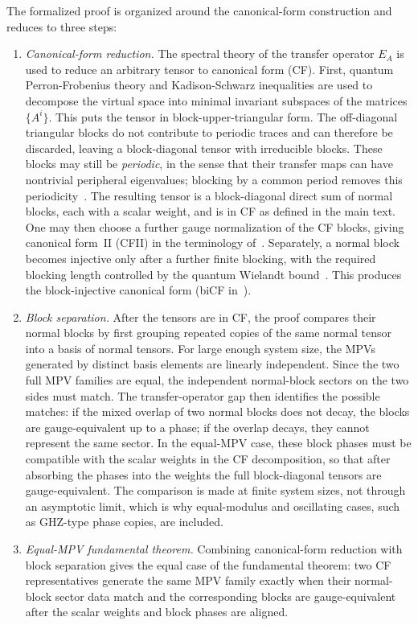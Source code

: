 The formalized proof is organized around the canonical-form construction and reduces to three steps:
\begin{enumerate}[label={(\roman*)},leftmargin=*]
    \item \textit{Canonical-form reduction.} The spectral theory of the transfer operator $E_A$ is used to reduce an arbitrary tensor to canonical form (CF). First, quantum Perron-Frobenius theory and Kadison-Schwarz inequalities are used to decompose the virtual space into minimal invariant subspaces of the matrices $\{A^i\}$. This puts the tensor in block-upper-triangular form. The off-diagonal triangular blocks do not contribute to periodic traces and can therefore be discarded, leaving a block-diagonal tensor with irreducible blocks. These blocks may still be \textit{periodic}, in the sense that their transfer maps can have nontrivial peripheral eigenvalues; blocking by a common period removes this periodicity~\cite{Fannes1992Finitely}. The resulting tensor is a block-diagonal direct sum of normal blocks, each with a scalar weight, and is in CF as defined in the main text. One may then choose a further gauge normalization of the CF blocks, giving canonical form~II (CFII) in the terminology of~\cite{Cirac2017Matrixa}. Separately, a normal block becomes injective only after a further finite blocking, with the required blocking length controlled by the quantum Wielandt bound~\cite{Sanz2010Quantum}. This produces the block-injective canonical form (biCF in~\cite{Cirac2017Matrixa}). 

    \item \textit{Block separation.} After the tensors are in CF, the proof compares their normal blocks by first grouping repeated copies of the same normal tensor into a basis of normal tensors. For large enough system size, the MPVs generated by distinct basis elements are linearly independent. Since the two full MPV families are equal, the independent normal-block sectors on the two sides must match. The transfer-operator gap then identifies the possible matches: if the mixed overlap of two normal blocks does not decay, the blocks are gauge-equivalent up to a phase; if the overlap decays, they cannot represent the same sector. In the equal-MPV case, these block phases must be compatible with the scalar weights in the CF decomposition, so that after absorbing the phases into the weights the full block-diagonal tensors are gauge-equivalent. The comparison is made at finite system sizes, not through an asymptotic limit, which is why equal-modulus and oscillating cases, such as GHZ-type phase copies, are included.

    \item \textit{Equal-MPV fundamental theorem.} Combining canonical-form reduction with block separation gives the equal case of the fundamental theorem: two CF representatives generate the same MPV family exactly when their normal-block sector data match and the corresponding blocks are gauge-equivalent after the scalar weights and block phases are aligned.
\end{enumerate}


